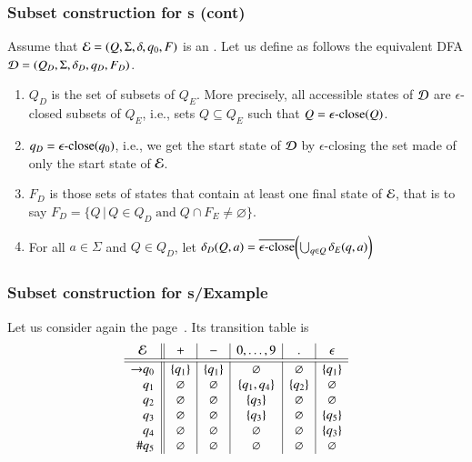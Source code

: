 %
\begin{frame}
\frametitle{Subset construction for {\eNFA}s (cont)}

Assume that \({\cal E} = (Q, \Sigma, \delta, q_0, F)\) is an
\eNFA. Let us define as follows the equivalent DFA \({\cal D} = (Q_D,
\Sigma, \delta_D, q_D, F_D)\).
\begin{enumerate}

  \item \(Q_D\) is the set of subsets of \(Q_E\). More precisely, all
    accessible states of \(\cal D\) are \(\epsilon\)-closed subsets of
    \(Q_E\), i.e., sets \(Q \subseteq Q_E\) such that \(Q =
    \epsilon\text{-close}(Q)\).

  \item \(q_D = \epsilon\text{-close} (q_0)\), i.e., we get the start state
  of \(\cal D\) by \(\epsilon\)-closing the set made of only the start
  state of \(\cal E\).

  \item \(F_D\) is those sets of states that contain at least one
  final state of \(\cal E\), that is to say \(F_D = \{Q \, \lvert
  \, Q \in Q_D \; \text{and} \; Q \cap F_E \neq \varnothing\}\).

  \item For all \(a \in \Sigma\) and \(Q \in Q_D\), let
  \(
  \delta_D (Q, a) = \overline{\epsilon\text{-close}} \biggl(\bigcup_{q \in Q}{\delta_E (q,
    a)}\biggr)
  \)

 \end{enumerate}

\end{frame}

%
\begin{frame}
\frametitle{Subset construction for {\eNFA}s/Example}

Let us consider again the \eNFA page~\pageref{enfa_num}. Its transition
table is
\[
\begin{array}{r@{}l||c|c|c|c|c}
\multicolumn{2}{c||}{\cal E} & + & - & 0, \ldots, 9 & \mathtt{.} &
\epsilon\\
\hline\hline
\rightarrow & q_0 & \{q_1\} & \{q_1\} & \varnothing & \varnothing
                  & \{q_1\}\\
            & q_1 & \varnothing  & \varnothing & \{q_1, q_4\}
                  & \{q_2\} & \varnothing\\
            & q_2 & \varnothing  & \varnothing & \{q_3\} & \varnothing
                  & \varnothing\\
            & q_3 & \varnothing & \varnothing & \{q_3\} & \varnothing
                  & \{q_5\}\\
            & q_4 & \varnothing & \varnothing & \varnothing
                  & \varnothing & \{q_3\}\\
         \# & q_5 & \varnothing & \varnothing & \varnothing
                  & \varnothing & \varnothing
\end{array}
\]

\end{frame}

